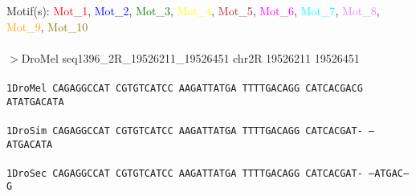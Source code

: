 \documentclass[11pt,twoside,reqno,a4paper]{article}
\begin{document}
\noindent
\newlength{\charwidth}Motif(s): \textcolor{red}{Mot\_1}, \textcolor{blue}{Mot\_2}, \textcolor{green}{Mot\_3}, \textcolor{yellow}{Mot\_4}, \textcolor{brown}{Mot\_5}, \textcolor{magenta}{Mot\_6}, \textcolor{cyan}{Mot\_7}, \textcolor{violet}{Mot\_8}, \textcolor{orange}{Mot\_9}, \textcolor{olive}{Mot\_10}\\
\\
$>$DroMel	seq1396\_2R\_19526211\_19526451	chr2R	19526211	19526451 \\
 \\
\texttt{1\hspace*{4\charwidth}DroMel	CAGAGGCCAT	CGTGTCATCC	AAGATTATGA	TTTTGACAGG	CATCACGACG	ATATGACATA	\\
\hspace*{5\charwidth}\hspace*{7\charwidth}\hspace*{1\charwidth}\hspace*{1\charwidth}\hspace*{1\charwidth}\hspace*{1\charwidth}\hspace*{1\charwidth}\hspace*{1\charwidth}\\
1\hspace*{4\charwidth}DroSim	CAGAGGCCAT	CGTGTCATCC	AAGATTATGA	TTTTGACAGG	CATCACGAT-	--ATGACATA	\\
\hspace*{5\charwidth}\hspace*{7\charwidth}\hspace*{1\charwidth}\hspace*{1\charwidth}\hspace*{1\charwidth}\hspace*{1\charwidth}\hspace*{1\charwidth}\hspace*{1\charwidth}\\
1\hspace*{4\charwidth}DroSec	CAGAGGCCAT	CGTGTCATCC	AAGATTATGA	TTTTGACAGG	CATCACGAT-	--ATGAC--G	\\
\hspace*{5\charwidth}\hspace*{7\charwidth}\hspace*{1\charwidth}\hspace*{1\charwidth}\hspace*{1\charwidth}\hspace*{1\charwidth}\hspace*{1\charwidth}\hspace*{1\charwidth}\\
}
\end{document}
